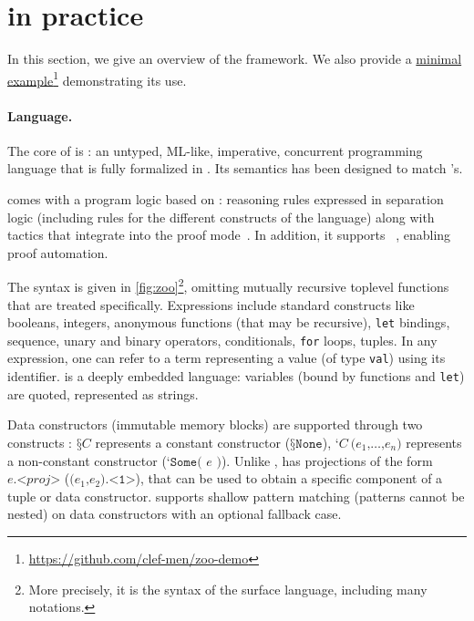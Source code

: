 \section{\Zoo in practice}
\label{sec:zoo}



In this section, we give an overview of the framework.
We also provide a \href{https://github.com/clef-men/zoo-demo}{minimal example}\footnote{\url{https://github.com/clef-men/zoo-demo}} demonstrating its use.

\paragraph{Language.}

The core of \Zoo is \ZooLang: an untyped, ML-like, imperative, concurrent programming language that is fully formalized in \Coq.
Its semantics has been designed to match \OCaml's.

\ZooLang comes with a program logic based on \Iris : reasoning rules expressed in separation logic (including rules for the different constructs of the language) along with \Coq tactics that integrate into the \Iris proof mode~\cite{DBLP:conf/popl/KrebbersTB17,DBLP:journals/pacmpl/KrebbersJ0TKTCD18}.
In addition, it supports \Diaframe~\cite{DBLP:conf/pldi/MulderKG22}, enabling proof automation.

The \ZooLang syntax is given in \cref{fig:zoo}\footnote{More precisely, it is the syntax of the surface language, including many \Coq notations.}, omitting mutually recursive toplevel functions that are treated specifically.
Expressions include standard constructs like booleans, integers, anonymous functions (that may be recursive), \texttt{let} bindings, sequence, unary and binary operators, conditionals, \texttt{for} loops, tuples.
In any expression, one can refer to a \Coq term representing a \ZooLang value (of type \texttt{val}) using its \Coq identifier.
\ZooLang is a deeply embedded language: variables (bound by functions and \texttt{let}) are quoted, represented as strings.

Data constructors (immutable memory blocks) are supported through two constructs : $\texttt{§}C$ represents a constant constructor (\eg $\texttt{§}\texttt{None}$), $\texttt{‘} C\ \texttt{(} e_1 \texttt{,} \dots \texttt{,} e_n \texttt{)}$ represents a non-constant constructor (\eg $\texttt{‘} \texttt{Some( } e \texttt{ )}$).
Unlike \OCaml, \ZooLang has projections of the form $e \texttt{.<} \mathit{proj} \texttt{>}$ (\eg $\texttt{(} e_1 \texttt{,} e_2 \texttt{).<1>}$), that can be used to obtain a specific component of a tuple or data constructor.
\ZooLang supports shallow pattern matching (patterns cannot be nested) on data constructors with an optional fallback case.

